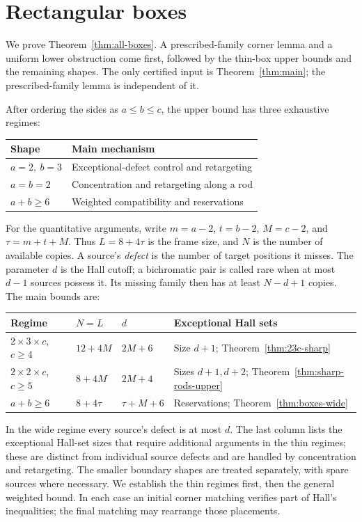 \section{Rectangular boxes}\label{sec:boxes}
We prove Theorem~\ref{thm:all-boxes}. A prescribed-family corner lemma
and a uniform lower obstruction come first, followed by the thin-box
upper bounds and the remaining shapes. The only certified input is
Theorem~\ref{thm:main}; the prescribed-family lemma is independent of it.

After ordering the sides as $a\le b\le c$, the upper bound has three
exhaustive regimes:
\begin{center}
\begin{tabular}{ll}
\toprule
Shape & Main mechanism\\
\midrule
$a=2,\ b=3$ & Exceptional-defect control and retargeting\\
$a=b=2$ & Concentration and retargeting along a rod\\
$a+b\ge6$ & Weighted compatibility and reservations\\
\bottomrule
\end{tabular}
\end{center}
For the quantitative arguments, write
$m=a-2$, $t=b-2$, $M=c-2$, and $\tau=m+t+M$. Thus
$L=8+4\tau$ is the frame size, and $N$ is the number of available copies.
A source's \emph{defect} is the number of target positions it misses.
The parameter $d$ is the Hall cutoff; a bichromatic pair is called rare
when at most $d-1$ sources possess it. Its missing family then has at least
$N-d+1$ copies. The main bounds are:
\begin{center}
\small
\begin{tabular}{llll}
\toprule
Regime & $N=L$ & $d$ & Exceptional Hall sets\\
\midrule
$2\times3\times c$, $c\ge4$ & $12+4M$ & $2M+6$ & Size $d+1$; Theorem~\ref{thm:23c-sharp}\\
$2\times2\times c$, $c\ge5$ & $8+4M$ & $2M+4$ & Sizes $d+1,d+2$; Theorem~\ref{thm:sharp-rods-upper}\\
$a+b\ge6$ & $8+4\tau$ & $\tau+M+6$ & Reservations; Theorem~\ref{thm:boxes-wide}\\
\bottomrule
\end{tabular}
\end{center}
In the wide regime every source's defect is at most $d$. The last column
lists the exceptional Hall-set sizes that require additional arguments in
the thin regimes; these are distinct from individual source defects and are handled by
concentration and retargeting. The smaller boundary shapes are treated
separately, with spare sources where necessary.
We establish the thin regimes first, then the general weighted bound.
In each case an initial corner matching verifies part of Hall's inequalities;
the final matching may rearrange those placements.

